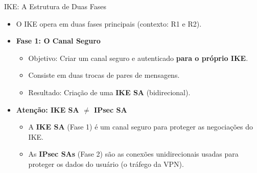 \begin{frame}{IKE: A Estrutura de Duas Fases}
    \begin{itemize}
        \item O IKE opera em duas fases principais (contexto: R1 e R2).

        \item \textbf{Fase 1: O Canal Seguro}
              \begin{itemize}
                  \item Objetivo: Criar um canal seguro e autenticado \textbf{para o próprio IKE}.
                  \item Consiste em duas trocas de pares de mensagens.
                  \item Resultado: Criação de uma \textbf{IKE SA} (bidirecional).
              \end{itemize}

        \item \textbf{Atenção: IKE SA $\neq$ IPsec SA}
              \begin{itemize}
                  \item A \textbf{IKE SA} (Fase 1) é um canal seguro para proteger as negociações do IKE.
                  \item As \textbf{IPsec SAs} (Fase 2) são as conexões unidirecionais usadas para proteger os dados do usuário (o tráfego da VPN).
              \end{itemize}
    \end{itemize}
\end{frame}


